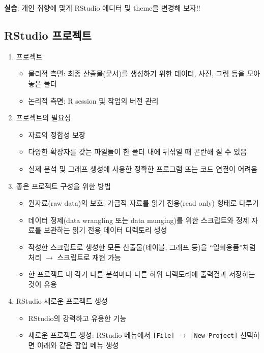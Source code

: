 \documentclass[
  11pt,
]{krantz}
\makeatletter
\providecommand{\tightlist}{%
  \setlength{\itemsep}{0pt}\setlength{\parskip}{0pt}}
\newenvironment{kframe}{%
\medskip{}
\setlength{\fboxsep}{.8em}
 \def\at@end@of@kframe{}%
 \ifinner\ifhmode%
  \def\at@end@of@kframe{\end{minipage}}%
  \begin{minipage}{\columnwidth}%
 \fi\fi%
 \def\FrameCommand##1{\hskip\@totalleftmargin \hskip-\fboxsep
 \colorbox{shadecolor}{##1}\hskip-\fboxsep
     \hskip-\linewidth \hskip-\@totalleftmargin \hskip\columnwidth}%
 \MakeFramed {\advance\hsize-\width
   \@totalleftmargin\z@ \linewidth\hsize
   \@setminipage}}%
 {\par\unskip\endMakeFramed%
 \at@end@of@kframe}
\newenvironment{rmdblock}[1]
  {
  \begin{itemize}
  \renewcommand{\labelitemi}{
    \raisebox{-.7\height}[0pt][0pt]{
      {\setkeys{Gin}{width=3em,keepaspectratio}\texttt{[image: images/\#1]}}
    }
  }
  \setlength{\fboxsep}{1em}
  \begin{kframe}
  \item
  }
  {
  \end{kframe}
  \end{itemize}
  }
\newenvironment{rmdimportant}
  {\begin{rmdblock}{important}}
  {\end{rmdblock}}
\makeatother
\begin{document}
\normalsize

\footnotesize

\begin{rmdimportant}
\textbf{실습}: 개인 취향에 맞게 RStudio 에디터 및 theme을 변경해 보자!!
\end{rmdimportant}

\normalsize

\hypertarget{rstudio-project}{%
\subsection{RStudio 프로젝트}\label{rstudio-project}}

\begin{enumerate}
\def\labelenumi{\arabic{enumi}.}
\tightlist
\item
  프로젝트

  \begin{itemize}
  \tightlist
  \item
    물리적 측면: 최종 산출물(문서)를 생성하기 위한 데이터, 사진, 그림 등을 모아 놓은 폴더
  \item
    논리적 측면: R session 및 작업의 버전 관리
  \end{itemize}
\item
  프로젝트의 필요성

  \begin{itemize}
  \tightlist
  \item
    자료의 정합성 보장
  \item
    다양한 확장자를 갖는 파일들이 한 폴더 내에 뒤섞일 때 곤란해 질 수 있음
  \item
    실제 분석 및 그래프 생성에 사용한 정확한 프로그램 또는 코드 연결이 어려움
  \end{itemize}
\item
  좋은 프로젝트 구성을 위한 방법

  \begin{itemize}
  \tightlist
  \item
    원자료(raw data)의 보호: 가급적 자료를 읽기 전용(read only) 형태로 다루기
  \item
    데이터 정제(data wrangling 또는 data munging)를 위한 스크립트와 정제 자료를 보관하는 읽기 전용 데이터 디렉토리 생성
  \item
    작성한 스크립트로 생성한 모든 산출물(테이블, 그래프 등)을 ``일회용품''처럼 처리 \(\rightarrow\) 스크립트로 재현 가능
  \item
    한 프로젝트 내 각기 다른 분석마다 다른 하위 디렉토리에 출력결과 저장하는 것이 유용
  \end{itemize}
\item
  RStudio 새로운 프로젝트 생성

  \begin{itemize}
  \tightlist
  \item
    RStudio의 강력하고 유용한 기능
  \item
    새로운 프로젝트 생성: RStudio 메뉴에서 \texttt{{[}File{]}} \(\rightarrow\) \texttt{{[}New\ Project{]}} 선택하면 아래와 같은 팝업 메뉴 생성
  \end{itemize}
\end{enumerate}
\end{document}
